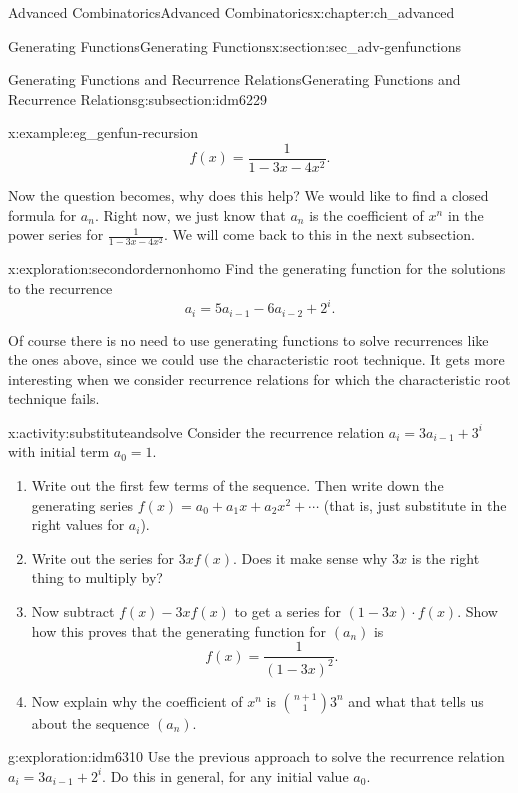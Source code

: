 \documentclass[oneside,10pt,]{book}
\numberwithin{equation}{chapter}
\begin{document}
\begin{chapterptx}{Advanced Combinatorics}{}{Advanced Combinatorics}{}{}{x:chapter:ch_advanced}
\begin{sectionptx}{Generating Functions}{}{Generating Functions}{}{}{x:section:sec_adv-genfunctions}
\begin{subsectionptx}{Generating Functions and Recurrence Relations}{}{Generating Functions and Recurrence Relations}{}{}{g:subsection:idm6229}
\begin{example}{}{x:example:eg_genfun-recursion}
\begin{equation*}
f(x) = \frac{1}{1-3x-4x^2}\text{.}
\end{equation*}
%
\par
Now the question becomes, why does this help?  We would like to find a closed formula for \(a_n\).  Right now, we just know that \(a_n\) is the coefficient of \(x^n\) in the power series for \(\frac{1}{1-3x-4x^2}\).  We will come back to this in the next subsection.%
\end{example}
\begin{exploration}{}{x:exploration:secondordernonhomo}%
Find the generating function for the solutions to the recurrence%
\begin{equation*}
a_i=5a_{i-1}-6a_{i-2} + 2^i.
\end{equation*}
%
\end{exploration}
Of course there is no need to use generating functions to solve recurrences like the ones above, since we could use the characteristic root technique.  It gets more interesting when we consider recurrence relations for which the characteristic root technique fails.%
\begin{activity}{}{x:activity:substituteandsolve}%
Consider the recurrence relation \(a_i=3a_{i-1} + 3^i\) with initial term \(a_0 = 1\).%
\begin{enumerate}[font=\bfseries,label=(\alph*),ref=\alph*]
\item{}Write out the first few terms of the sequence.  Then write down the generating series \(f(x) = a_0 + a_1x + a_2x^2 + \cdots\) (that is, just substitute in the right values for \(a_i\)). %
\item{}Write out the series for \(3x f(x)\).  Does it make sense why \(3x\) is the right thing to multiply by?%
\item{}Now subtract \(f(x) - 3xf(x)\) to get a series for \((1-3x)\cdot f(x)\).  Show how this proves that the generating function for \((a_n)\) is%
\begin{equation*}
f(x) = \frac{1}{(1-3x)^2}\text{.}
\end{equation*}
%
\item{}Now explain why the coefficient of \(x^n\) is \(\binom{n+1}{1}3^n\) and what that tells us about the sequence \((a_n)\).%
\end{enumerate}
\end{activity}
\begin{exploration}{}{g:exploration:idm6310}%
Use the previous approach to solve the recurrence relation \(a_i=3a_{i-1} + 2^i\).  Do this in general, for any initial value \(a_0\).%

\end{exploration}
\end{subsectionptx}
\end{sectionptx}
\end{chapterptx}
\end{document}
